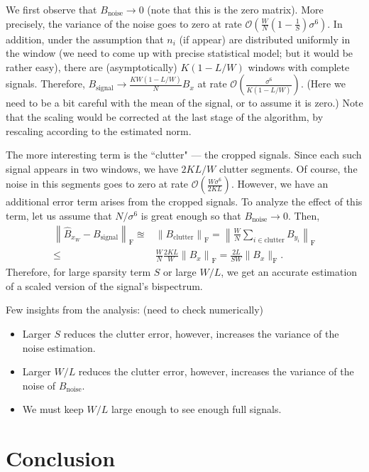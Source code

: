 \documentclass[12pt,a4paper]{article}
\numberwithin{equation}{section}
\numberwithin{figure}{section}
\theoremstyle{plain}
\theoremstyle{definition}
\theoremstyle{remark}
\theoremstyle{plain}
\theoremstyle{remark}
\theoremstyle{plain}
\theoremstyle{plain}
\newcommand{\order}[1]{\mathcal{O}\left({#1} \right)}
\begin{document}
We first observe that $B_\textrm{noise}\to 0$ (note that this is the zero matrix). More precisely, the variance of the noise goes to zero at rate  $\order{\frac{W}{N}\left(1-\frac{1}{S}\right)\sigma^6}$. In addition, under the assumption that $n_i$ (if appear) are distributed uniformly in the window (we need to come up with precise statistical model; but it would be rather easy), there are (asymptotically) $K(1-L/W)$ windows with complete signals. Therefore,
$B_\textrm{signal}\to \frac{KW(1-L/W)}{N}B_x$ at rate $\order{\frac{\sigma^6}{K(1-L/W)}}$. (Here we need to be a bit careful with the mean of the signal, or to assume it is zero.) Note that the scaling would be corrected at the last stage of the algorithm, by rescaling according to the estimated  norm.

The more interesting term is the ``clutter" --- the cropped signals. Since each such signal appears in two windows,
we have $2KL/W$ clutter segments. Of course, the noise in this segments goes to zero
at rate $\order{\frac{W\sigma^6}{2KL}}$. However, we have an additional error term arises from  the cropped signals. To analyze the effect of this term, let us assume that $N/\sigma^6$ is great enough so that $B_\textrm{noise}\to 0$. Then,
\begin{equation}
\begin{split}
\left\| \hat{B}_{x_W} - B_\textrm{signal}\right\|_{\textrm{F}} \approxeq&  \left\|B_\textrm{clutter}\right\|_{\textrm{F}}
= \left\|\frac{W}{N}\sum_{i\in\textrm{clutter}}B_{y_i}\right\|_{\textrm{F}}
\\ \leq & 
\frac{W}{N}\frac{2KL}{W}\left\|B_x\right\|_{\textrm{F}} = \frac{2L}{SW}
\|B_x\|_{\textrm{F}}.
\end{split}
\end{equation}
Therefore, for large sparsity term $S$ or large $W/L$, we get an accurate estimation of a scaled version of the signal's bispectrum. 


Few insights from the analysis: (need to check numerically)
\begin{itemize}
	\item Larger $S$ reduces the clutter error, however, increases the variance of the noise estimation.
	\item Larger $W/L$ reduces the clutter error, however, increases the variance of the noise  of $B_\textrm{noise}$.
	\item We must keep $W/L$ large enough to see enough full signals.    
\end{itemize} 




\section{Conclusion} \label{sec:conclusion}






\end{document}
